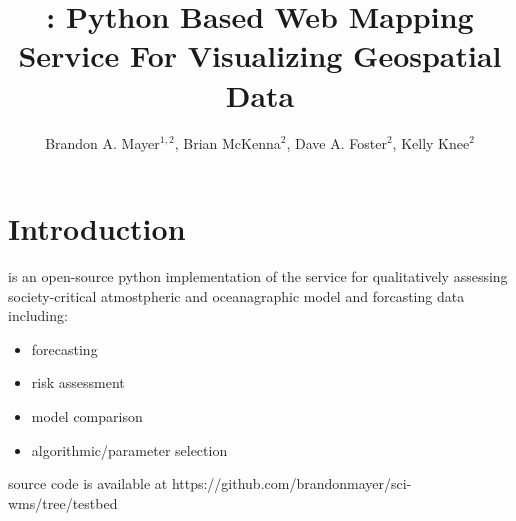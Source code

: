 \documentclass[noback,noborder,portrait,twocolumn]{cuposter}
\begin{document}

\newcommand{\figspace}{\vskip 20pt plus 5pt minus 5pt}
\newcommand{\captionspace}{\vskip 10pt plus 5pt minus 5pt}


\newcommand{\getIncFigcounter}{\stepcounter{figcounter}\thefigcounter}
\title{\sciwms{}: Python Based Web Mapping Service For Visualizing Geospatial Data}

\newcommand{\getIncTablecounter}{\stepcounter{tablecounter}\thetablecounter}

\author{Brandon A. Mayer$^{1,2}$, Brian McKenna$^{2}$, Dave A. Foster$^{2}$, Kelly Knee$^{2}$}
\address{Brown University, Providence RI, USA$^{1}$; RPS-ASA, South Kingston RI, USA$^{2}$}

\makeposter

\section{Introduction}
\sciwms{} is an open-source python implementation of the \ogc{} \wms{} service for qualitatively assessing society-critical atmostpheric and oceanagraphic model and forcasting data including:

\begin{itemize}
  \item forecasting
  \item risk assessment
  \item model comparison
  \item algorithmic/parameter selection
\end{itemize}

\sciwms{} source code is available at https://github.com/brandonmayer/sci-wms/tree/testbed
\end{document}
